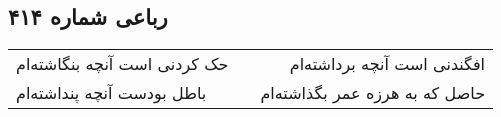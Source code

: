 \begin{center}
\section*{رباعی شماره ۴۱۴}
\label{sec:sh414}
\begin{longtable}{l p{0.5cm} r}
حک کردنی است آنچه بنگاشته‌ام
&&
افگندنی است آنچه برداشته‌ام
\\
باطل بودست آنچه پنداشته‌ام
&&
حاصل که به هرزه عمر بگذاشته‌ام
\\
\end{longtable}
\end{center}
